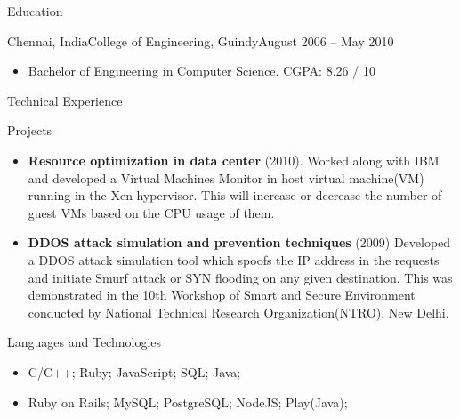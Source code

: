 \documentclass[]{mcdowellcv}
\begin{document}
	\begin{cvsection}{Education}
		\begin{cvsubsection}{Chennai, India}{College of Engineering, Guindy}{August 2006 --  May 2010}
		
			\begin{itemize}
			\end{itemize}
			\begin{itemize}
				\item Bachelor of Engineering in Computer Science. {      }{      }{      }{      } {      }{      }{      }{      } {      }{      }{      }{      } {      }{      }{      }{      } {      }{      }{      }{      } {      }{      }{      }{      } {      }{      }{      }{      } {      }{      }{      }{      }  {      }{      }{      }{      } {      }{      }{      }{      } {      }{      }{      }{      } {      }CGPA: 8.26 / 10
			\end{itemize}
		\end{cvsubsection}
	\end{cvsection}
		\begin{cvsection}{Technical Experience}
		\begin{cvsubsection}{Projects}{}{}
			\begin{itemize}
				\item \textbf{Resource optimization in data center} (2010). Worked along with IBM and developed a Virtual Machines Monitor in host virtual machine(VM) running in the Xen hypervisor. This will increase or decrease the number of guest VMs based on the CPU usage of them.
				\item \textbf{DDOS attack simulation and prevention techniques} (2009) Developed a DDOS attack simulation tool which spoofs the IP address in the requests and initiate Smurf attack or SYN flooding on any given destination. This was demonstrated in the 10th Workshop of
Smart and Secure Environment conducted by National Technical Research Organization(NTRO), New Delhi.
			\end{itemize}
		\end{cvsubsection}
	\end{cvsection}

	\begin{cvsection}{Languages and Technologies}
		\begin{cvsubsection}{}{}{}
			\begin{itemize}
				\item C/C++; Ruby; JavaScript; SQL; Java;
				\item Ruby on Rails; MySQL; PostgreSQL; NodeJS; Play(Java);
			\end{itemize}
		\end{cvsubsection}
	\end{cvsection}
\end{document}
